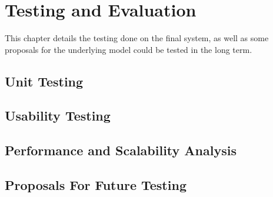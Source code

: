 \chapter{Testing and Evaluation}
\label{chapter:evaluation}
  This chapter details the testing done on the final system, as well as some proposals for the underlying model could be tested in the long term.

  \section{Unit Testing}
  \section{Usability Testing}
  \section{Performance and Scalability Analysis}
  \section{Proposals For Future Testing}
